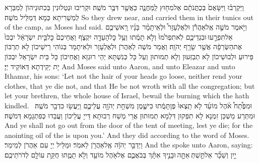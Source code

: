 {וַֽיִּקְרְב֗וּ וַיִּשָּׂאֻם֙ בְּכֻתֳּנֹתָ֔ם אֶל\maqqaf מִח֖וּץ לַֽמַּחֲנֶ֑ה כַּאֲשֶׁ֖ר דִּבֶּ֥ר מֹשֶֽׁה׃}
{וּקְרִיבוּ וּנְטַלוּנִין בְּכִתּוּנֵיהוֹן לְמִבַּרָא לְמַשְׁרִיתָא כְּמָא דְּמַלֵּיל מֹשֶׁה׃}
{So they drew near, and carried them in their tunics out of the camp, as Moses had said.}{}
{וַיֹּ֣אמֶר מֹשֶׁ֣ה אֶֽל\maqqaf אַהֲרֹ֡ן וּלְאֶלְעָזָר֩ וּלְאִֽיתָמָ֨ר \pasek  בָּנָ֜יו רָֽאשֵׁיכֶ֥ם אַל\maqqaf תִּפְרָ֣עוּ \legarmeh  וּבִגְדֵיכֶ֤ם לֹֽא\maqqaf תִפְרֹ֙מוּ֙ וְלֹ֣א תָמֻ֔תוּ וְעַ֥ל כׇּל\maqqaf הָעֵדָ֖ה יִקְצֹ֑ף וַאֲחֵיכֶם֙ כׇּל\maqqaf בֵּ֣ית יִשְׂרָאֵ֔ל יִבְכּוּ֙ אֶת\maqqaf הַשְּׂרֵפָ֔ה אֲשֶׁ֖ר שָׂרַ֥ף יְהֹוָֽה׃}
{וַאֲמַר מֹשֶׁה לְאַהֲרֹן וּלְאֶלְעָזָר וּלְאִיתָמָר בְּנוֹהִי רֵישֵׁיכוֹן לָא תְרַבּוֹן פֵּירוּעַ וּלְבוּשֵׁיכוֹן לָא תְבַזְּעוּן וְלָא תְמוּתוּן וְעַל כָּל כְּנִשְׁתָּא יְהֵי רוּגְזָא וַאֲחֵיכוֹן כָּל בֵּית יִשְׂרָאֵל יִבְכּוֹן יָת יְקֵידְתָא דְּאוֹקֵיד יְיָ׃}
{And Moses said unto Aaron, and unto Eleazar and unto Ithamar, his sons: ‘Let not the hair of your heads go loose, neither rend your clothes, that ye die not, and that He be not wroth with all the congregation; but let your brethren, the whole house of Israel, bewail the burning which the \lord\space hath kindled.}{}
{וּמִפֶּ֩תַח֩ אֹ֨הֶל מוֹעֵ֜ד לֹ֤א תֵֽצְאוּ֙ פֶּן\maqqaf תָּמֻ֔תוּ כִּי\maqqaf שֶׁ֛מֶן מִשְׁחַ֥ת יְהֹוָ֖ה עֲלֵיכֶ֑ם וַֽיַּעֲשׂ֖וּ כִּדְבַ֥ר מֹשֶֽׁה׃ \petucha }
{וּמִתְּרַע מַשְׁכַּן זִמְנָא לָא תִפְּקוּן דִּלְמָא תְמוּתוּן אֲרֵי מְשַׁח רְבוּתָא דַּייָ עֲלֵיכוֹן וַעֲבַדוּ כְּפִתְגָמָא דְּמֹשֶׁה׃}
{And ye shall not go out from the door of the tent of meeting, lest ye die; for the anointing oil of the \lord\space is upon you.’ And they did according to the word of Moses.}{}
{וַיְדַבֵּ֣ר יְהֹוָ֔ה אֶֽל\maqqaf אַהֲרֹ֖ן לֵאמֹֽר׃}
{וּמַלֵּיל יְיָ עִם אַהֲרֹן לְמֵימַר׃}
{And the \lord\space spoke unto Aaron, saying:}{}
{יַ֣יִן וְשֵׁכָ֞ר אַל\maqqaf תֵּ֣שְׁתְּ \legarmeh  אַתָּ֣ה \legarmeh  וּבָנֶ֣יךָ אִתָּ֗ךְ בְּבֹאֲכֶ֛ם אֶל\maqqaf אֹ֥הֶל מוֹעֵ֖ד וְלֹ֣א תָמֻ֑תוּ חֻקַּ֥ת עוֹלָ֖ם לְדֹרֹתֵיכֶֽם׃}
